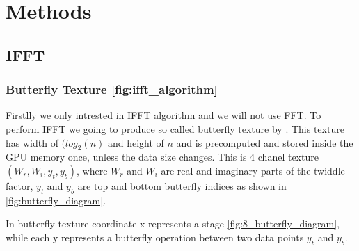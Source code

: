 \chapter{Methods}
\label{chapter2}



\section{IFFT}
\subsection{Butterfly Texture \ref{fig:ifft_algorithm}}
Firstlly we only intrested in IFFT algorithm and we will not use FFT.
To perform IFFT we going to produce so called butterfly texture by \cite[Fl{\"u}gge Fynn-Jorin]{flugge2017}.
This texture has width of $(log_2(n)$ and height of $n$ and is precomputed and stored inside the GPU memory once, unless the data size changes. This is 4 chanel texture $(W_r, W_i, y_t, y_b)$,
where $W_r$ and $W_i$ are real and imaginary parts of the twiddle factor, $y_t$ and $y_b$ are top and bottom butterfly indices as shown in \ref{fig:butterfly_diagram}.

In butterfly texture coordinate x represents a stage \ref{fig:8_butterfly_diagram}, while each y represents a butterfly operation between two data points $y_t$ and $y_b$.

